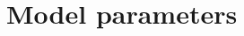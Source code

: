 \documentclass[10pt,a4paper,twoside,american]{article}
\theoremstyle{definitionstyle}
\begin{document}
\section{Model parameters}
\label{sec:model_parameters}
\renewcommand{\arraystretch}{1.2}
\def\widthA{0.1}
\def\widthB{0.2}
\def\widthC{0.7}
\begin{table}[H]



\end{table}
\end{document}
